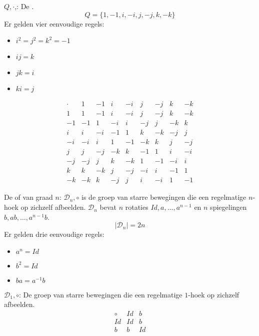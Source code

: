 \documentclass[main.tex]{subfiles}
\begin{document}
\begin{de}
  $Q,\cdot$,: De .\\
  \[ Q = \{ 1,-1,i,-i,j,-j,k,-k \} \]
  Er gelden vier eenvoudige regels:
  \begin{itemize}
  \item $i^{2}=j^{2}=k^{2}= -1$
  \item $ij=k$
  \item $jk=i$
  \item $ki=j$
  \end{itemize}
  \[
  \begin{array}{r|rrrrrrrr}
\cdot & 1 & -1 & i & -i & j & -j & k & -k\\
\hline
1 & 1 & -1 & i & -i & j & -j & k & -k\\
-1 & -1 & 1 & -i & i & -j & j & -k & k\\
i & i & -i & -1 & 1 & k & -k & -j & j\\
-i & -i & i & 1 & -1 & -k & k & j & -j\\
j & j & -j & -k & k & -1 & 1 & i & -i\\
-j & -j & j & k & -k & 1 & -1 & -i & i\\
k & k & -k & j & -j & -i & i & -1 & 1\\
-k & -k & k & -j & j & i & -i & 1 & -1
  \end{array}
\]
\end{de}

\begin{de}
  De  of  van graad $n$: $\mathcal{D}_{n},\circ$ is de groep van starre bewegingen die een regelmatige $n$-hoek op zichzelf afbeelden.
  $\mathcal{D}_{n}$ bevat $n$ rotaties $Id, a, \dotsc, a^{n-1}$ en $n$ spiegelingen $b,ab,\dotsc,a^{n-1}b$.
  \[ |\mathcal{D}_{n}| = 2n \]
  Er gelden drie eenvoudige regels:
  \begin{itemize}
  \item $a^{n} = Id$
  \item $b^{2} = Id$
  \item $ba = a^{-1}b$
  \end{itemize}
\end{de}

\begin{vb}
  $\mathcal{D}_{1},\circ$: De groep van starre bewegingen die een regelmatige $1$-hoek op zichzelf afbeelden.
  \[
  \begin{array}{c|cccccc}
    \circ & Id & b\\
    \hline
    Id & Id & b\\
    b & b & Id\\
  \end{array}
  \]
\commj
\end{vb}
\end{document}
